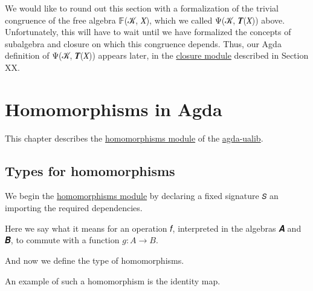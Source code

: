\documentclass[sigplan,screen]{acmart}
\newcommand{\agdaualib}{\href{https://ualib.org}{agda-ualib}\xspace}
\newcommand\homomorphismsmodule{\href{https://gitlab.com/ualib/ualib.gitlab.io/-/blob/master/homomorphisms.lagda.rst}{homomorphisms module}\xspace}
\newcommand\closuremodule{\href{https://gitlab.com/ualib/ualib.gitlab.io/-/blob/master/congruences.lagda.rst}{closure module}\xspace}
\begin{document}
We would like to round out this section with a formalization of the trivial congruence of the free algebra 𝔽(𝒦, 𝑋), which we called Ψ(𝒦, 𝑻(𝑋)) above. Unfortunately, this will have to wait until we have formalized the concepts of subalgebra and closure on which this congruence depends. Thus, our Agda definition of Ψ(𝒦, 𝑻(𝑋)) appears later, in the \closuremodule described in Section XX.

\section{Homomorphisms in Agda}\label{homomorphisms-in-agda}
This chapter describes the \homomorphismsmodule of the \agdaualib.

\subsection{Types for homomorphisms}\label{types-for-homomorphisms}
We begin the \homomorphismsmodule by declaring a fixed signature \texttt{𝑆} an importing the
required dependencies.

\begin{code}\end{code}
Here we say what it means for an operation 𝑓, interpreted in the algebras 𝑨 and 𝑩, to commute with a function \(g : A → B\).
\begin{code}\end{code}
And now we define the type of homomorphisms.
\noindent
\begin{code}
  
\end{code}
An example of such a homomorphism is the identity map.
\begin{code}
\\[\AgdaEmptyExtraSkip]%
\>[0]\AgdaSpace{}%
\AgdaSymbol{:}%
\>[6]\AgdaSymbol{(}\AgdaSpace{}%
\AgdaSymbol{:}\AgdaSpace{}%
\AgdaSpace{}%
\AgdaSpace{}%
\AgdaSymbol{)}\AgdaSpace{}%
\AgdaSpace{}%
\AgdaSpace{}%
\AgdaSpace{}%
\<%
\\
\>[0]\AgdaSpace{}%
\AgdaSymbol{\AgdaUnderscore{}}\AgdaSpace{}%
\AgdaSymbol{=}\AgdaSpace{}%
\AgdaSpace{}%
\AgdaSpace{}%
\AgdaSpace{}%
\AgdaSymbol{)}\AgdaSpace{}%
\AgdaOperator{\AgdaInductiveConstructor{,}}\AgdaSpace{}%
\AgdaSpace{}%
\AgdaBound{\AgdaUnderscore{}}\AgdaSpace{}%
\AgdaBound{\AgdaUnderscore{}}\AgdaSpace{}%
\AgdaSpace{}%
\<%
\end{code}
\end{document}
